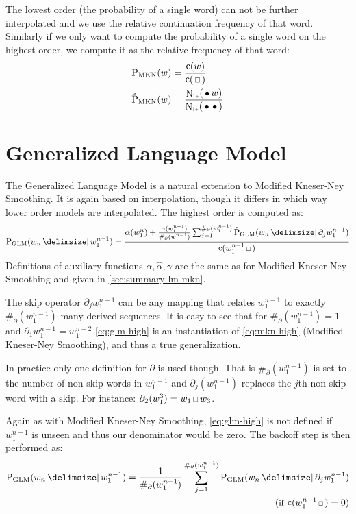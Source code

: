 \documentclass[11pt,a4paper]{report}
\newcommand*{\Scale}[2][4]{\scalebox{#1}{$#2$}}%
\DeclareMathOperator{\Count}{c}
\DeclareMathOperator{\ContCount}{N}
\newcommand{\ContCountIp}  {\ContCount_{\Scale[0.5]{1+}}}
\newcommand{\Skp}{\ensuremath{\,\Scale[0.7]{\square}\,}}
\newcommand{\WSkp}{\ensuremath{\,\bullet\,}}
\begin{document}
The lowest order (the probability of a single word) can not be further
interpolated and we use the relative continuation frequency of that word.
Similarly if we only want to compute the probability of a single word on the
highest order, we compute it as the relative frequency of that word:
\begin{subequations}
  \begin{align}
    \ProbMKN {w} &= \frac{\Count(w)}{\Count(\Skp)} \\
    \ProbMKN*{w} &= \frac{\ContCountIp(\WSkp w)}{\ContCountIp(\WSkp \WSkp)}
  \end{align}
\end{subequations}

\section{Generalized Language Model}
\label{sec:summary-lm-glm}

The Generalized Language Model is a natural extension to Modified Kneser-Ney
Smoothing.
It is again based on interpolation, though it differs in which way lower order
models are interpolated.
The highest order is computed as:
\begin{equation}
  \label{eq:glm-high}
  \ProbGLM{w_n}{w_1^{n-1}} =
    \frac{\alpha(w_1^n) + \frac{\gamma(w_1^{n-1})}{\#_\partial(w_1^{n-1})}
                          \sum_{j=1}^{\#_\partial(w_1^{n-1})} \ProbGLM*{w_n}{\partial_j w_1^{n-1}}}
         {\Count(w_1^{n-1} \Skp)}
\end{equation}
Definitions of auxiliary functions $\alpha, \hat\alpha, \gamma$ are the same as
for Modified Kneser-Ney Smoothing and given in \cref{sec:summary-lm-mkn}.

The skip operator $\partial_j w_1^{n-1}$ can be any mapping that relates
$w_1^{n-1}$ to exactly $\#_\partial(w_1^{n-1})$ many derived sequences.
It is easy to see that for $\#_\partial(w_1^{n-1}) = 1$ and
$\partial_1 w_1^{n-1} = w_1^{n-2}$ \cref{eq:glm-high} is an
instantiation of \cref{eq:mkn-high} (Modified Kneser-Ney Smoothing), and thus
a true generalization.

In practice only one definition for $\partial$ is used though.
That is $\#_\partial(w_1^{n-1})$ is set to the number of non-skip words in
$w_1^{n-1}$ and $\partial_j(w_1^{n-1})$ replaces the $j$th non-skip word with
a skip.
For instance: $\partial_2(w_1^3) = w_1 \Skp w_3$.

Again as with Modified Kneser-Ney Smoothing, \cref{eq:glm-high} is not
defined if $w_1^{n-1}$ is unseen and thus our denominator would be zero.
The backoff step is then performed as:
\begin{equation}
  \begin{split}
    \ProbGLM{w_n}{w_1^{n-1}} = \frac{1}{\#_\partial(w_1^{n-1})}
                               \sum_{j=1}^{\#_\partial(w_1^{n-1})} \ProbGLM{w_n}{\partial_j w_1^{n-1}} \\
      \hfill \small{(\text{if} \: \Count(w_1^{n-1} \Skp) = 0)}
  \end{split}
\end{equation}
\end{document}
